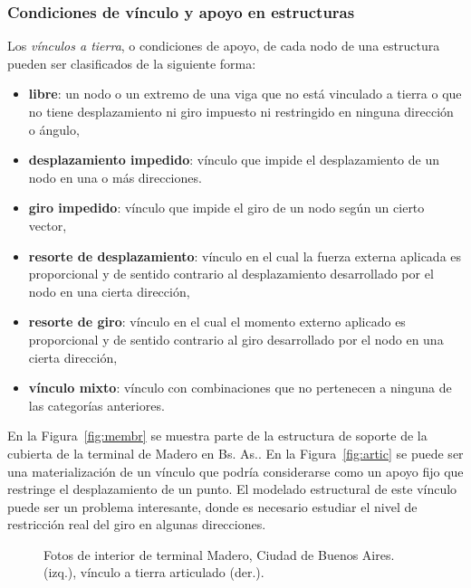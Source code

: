 \subsubsection{Condiciones de vínculo y apoyo en estructuras}

Los \textit{vínculos a tierra}, o condiciones de apoyo, de cada nodo de una estructura pueden ser clasificados de la siguiente forma:
%
\begin{itemize}
\item \textbf{libre}: un nodo o un extremo de una viga que no está vinculado a tierra o que no tiene desplazamiento ni giro impuesto ni restringido en ninguna dirección o ángulo,
%
\item \textbf{desplazamiento impedido}: vínculo que impide el desplazamiento de un nodo en una o más direcciones.
%
\item \textbf{giro impedido}: vínculo que impide el giro de un nodo según un cierto vector,
%
\item \textbf{resorte de desplazamiento}: vínculo en el cual la fuerza externa aplicada es proporcional y de sentido contrario al desplazamiento desarrollado por el nodo en una cierta dirección,
%
\item \textbf{resorte de giro}: vínculo en el cual el momento externo aplicado es proporcional y de sentido contrario al giro desarrollado por el nodo en una cierta dirección,
%
\item \textbf{vínculo mixto}: vínculo con combinaciones que no pertenecen a ninguna de las categorías anteriores.
%
\end{itemize}

En la Figura~\ref{fig:membr} se muestra parte de la estructura de soporte de la cubierta de la terminal de Madero en Bs. As.. %
%
En la Figura~\ref{fig:artic} se puede ser una materialización de un vínculo que podría considerarse como un apoyo fijo que restringe el desplazamiento de un punto. %
%
El modelado estructural de este vínculo puede ser un problema interesante, donde es necesario estudiar el nivel de restricción real del giro en algunas direcciones. %
%
\begin{figure}[htb]
	\centering
	\caption{Fotos de interior de terminal Madero, Ciudad de Buenos Aires.  (izq.), vínculo a tierra articulado (der.).}
	\label{fig:bsas}
\end{figure}

